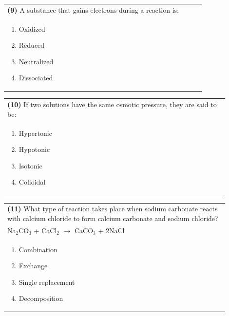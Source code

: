 \documentclass{article}
\begin{document}
\noindent\begin{tabular}{|p{0.9\linewidth}|}
\hline
\textbf{(9)} A substance that gains electrons during a reaction is:\\[0.2cm]
\begin{minipage}[t]{0.85\linewidth}
\begin{enumerate}[label=\alph*.]
\item Oxidized
\item Reduced
\item Neutralized
\item Dissociated
\end{enumerate}
\end{minipage}\\[0.2cm]
\hline
\end{tabular}

\noindent\begin{tabular}{|p{0.9\linewidth}|}
\hline
\textbf{(10)} If two solutions have the same osmotic pressure, they are said to be:\\[0.2cm]
\begin{minipage}[t]{0.85\linewidth}
\begin{enumerate}[label=\alph*.]
\item Hypertonic
\item Hypotonic
\item Isotonic
\item Colloidal
\end{enumerate}
\end{minipage}\\[0.2cm]
\hline
\end{tabular}

\noindent\begin{tabular}{|p{0.9\linewidth}|}
\hline
\textbf{(11)} What type of reaction takes place when sodium carbonate reacts with calcium chloride to form calcium carbonate and sodium chloride?\\[0.2cm]
Na$_2$CO$_3$ + CaCl$_2$ $\rightarrow$ CaCO$_3$ + 2NaCl\\[0.2cm]
\begin{minipage}[t]{0.85\linewidth}
\begin{enumerate}[label=\alph*.]
\item Combination
\item Exchange
\item Single replacement
\item Decomposition
\end{enumerate}
\end{minipage}\\[0.2cm]
\hline
\end{tabular}
\end{document}
